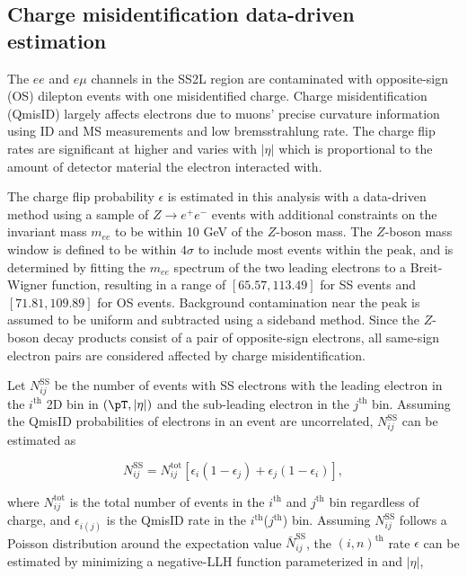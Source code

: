 \documentclass[../thesis.tex]{subfiles}
\begin{document}
\subsection{Charge misidentification data-driven estimation}
\label{sec:qmisid}
The $ee$ and $e\mu$ channels in the \acs{SS2L} region are contaminated with opposite-sign (\acs{OS}) dilepton events with one misidentified charge. Charge misidentification (\acs{QmisID}) largely affects electrons due to muons' precise curvature information using \acs{ID} and \acs{MS} measurements and low bremsstrahlung rate. The charge flip rates are significant at higher \pT and varies with $|\eta|$ which is proportional to the amount of detector material the electron interacted with.

The charge flip probability $\epsilon$ is estimated in this analysis with a data-driven method \citep{EXOT-2016-16} using a sample of $Z\rightarrow e^+e^-$ events with additional constraints on the invariant mass $m_{ee}$ to be within 10 GeV of the $Z$-boson mass. The $Z$-boson mass window is defined to be within $4\sigma$ to include most events within the peak, and is determined by fitting the $m_{ee}$ spectrum of the two leading electrons to a Breit-Wigner function, resulting in a range of $[65.57, 113.49]$ for SS events and $[71.81, 109.89]$ for \acs{OS} events. Background contamination near the peak is assumed to be uniform and subtracted using a sideband method. Since the $Z$-boson decay products consist of a pair of opposite-sign electrons, all same-sign electron pairs are considered affected by charge misidentification.

Let $N_{ij}^\mathrm{SS}$ be the number of events with \acs{SS} electrons with the leading electron in the $i^\mathrm{th}$ 2D bin in $(\pT,|\eta|)$ and the sub-leading electron in the $j^\mathrm{th}$ bin. Assuming the \acs{QmisID} probabilities of electrons in an event are uncorrelated, $N_{ij}^\mathrm{SS}$ can be estimated as

\begin{equation}
N_{ij}^\mathrm{SS} = N_{ij}^\mathrm{tot} \left[\epsilon_i(1-\epsilon_j) + \epsilon_j(1-\epsilon_i)\right],
\end{equation}

where $N_{ij}^\mathrm{tot}$ is the total number of events in the $i^\mathrm{th}$ and $j^\mathrm{th}$ bin regardless of charge, and $\epsilon_{i(j)}$ is the \acs{QmisID} rate in the $i^\mathrm{th}$($j^\mathrm{th}$) bin. Assuming $N_{ij}^\mathrm{SS}$ follows a Poisson distribution around the expectation value $\bar{N}_{ij}^\mathrm{SS}$, the $(i,n)^\text{th}$ rate $\epsilon$ can be estimated by minimizing a negative-\acs{LLH} function parameterized in \pT and $|\eta|$,
\end{document}

